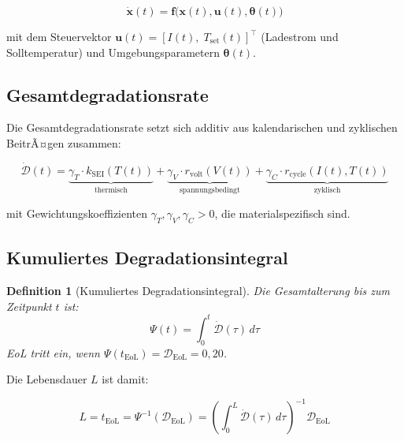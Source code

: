 ﻿\documentclass[12pt,a4paper]{article}
\newtheorem{definition}{Definition}[section]
\begin{document}
	\begin{equation}
		\dot{\mathbf{x}}(t) = \mathbf{f}\bigl(\mathbf{x}(t), \mathbf{u}(t), \boldsymbol{\theta}(t)\bigr)
		\label{eq:state_space}
	\end{equation}
	
	mit dem Steuervektor $\mathbf{u}(t) = [I(t),\; T_\mathrm{set}(t)]^\top$
	(Ladestrom und Solltemperatur) und Umgebungsparametern $\boldsymbol{\theta}(t)$.
	
	\subsection{Gesamtdegradationsrate}
	
	Die Gesamtdegradationsrate setzt sich additiv aus kalendarischen und zyklischen
	BeitrÃ¤gen zusammen:
	
	\begin{equation}
		\dot{\mathcal{D}}(t) = \underbrace{\gamma_T \cdot k_\mathrm{SEI}(T(t))}_{\text{thermisch}}
		+ \underbrace{\gamma_V \cdot r_\mathrm{volt}(V(t))}_{\text{spannungsbedingt}}
		+ \underbrace{\gamma_C \cdot r_\mathrm{cycle}(I(t), T(t))}_{\text{zyklisch}}
		\label{eq:total_degradation}
	\end{equation}
	
	mit Gewichtungskoeffizienten $\gamma_T, \gamma_V, \gamma_C > 0$, die materialspezifisch
	sind.
	
	\subsection{Kumuliertes Degradationsintegral}
	
	\begin{definition}[Kumuliertes Degradationsintegral]
		Die Gesamtalterung bis zum Zeitpunkt $t$ ist:
		\begin{equation}
			\Psi(t) = \int_0^t \dot{\mathcal{D}}(\tau)\, d\tau
			\label{eq:deg_integral}
		\end{equation}
		EoL tritt ein, wenn $\Psi(t_\mathrm{EoL}) = \mathcal{D}_\mathrm{EoL} = 0{,}20$.
	\end{definition}
	
	Die Lebensdauer $L$ ist damit:
	
	\begin{equation}
		L = t_\mathrm{EoL} = \Psi^{-1}(\mathcal{D}_\mathrm{EoL})
		= \left(\int_0^{L} \dot{\mathcal{D}}(\tau)\, d\tau\right)^{-1} \mathcal{D}_\mathrm{EoL}
		\label{eq:lifetime}
	\end{equation}
	
\end{document}

